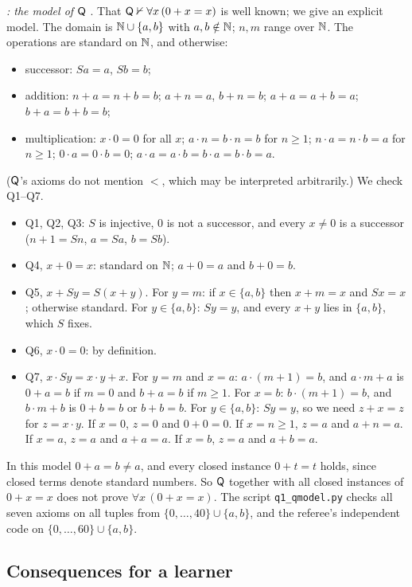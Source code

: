 \emph{: the model of $\mathsf{Q}$} . That $\mathsf{Q}\nvdash\forall x\,(0+x=x)$ is well known; we give an explicit model. The domain is $\mathbb{N}\cup\{a,b\}$ with $a,b\notin\mathbb{N}$; $n,m$ range over $\mathbb{N}$. The operations are standard on $\mathbb{N}$, and otherwise:
\begin{itemize}
\item successor: $Sa=a$, $Sb=b$;
\item addition: $n+a=n+b=b$; $a+n=a$, $b+n=b$; $a+a=a+b=a$; $b+a=b+b=b$;
\item multiplication: $x\cdot0=0$ for all $x$; $a\cdot n=b\cdot n=b$ for $n\ge1$; $n\cdot a=n\cdot b=a$ for $n\ge1$; $0\cdot a=0\cdot b=0$; $a\cdot a=a\cdot b=b\cdot a=b\cdot b=a$.
\end{itemize}
($\mathsf{Q}$'s axioms do not mention $<$, which may be interpreted arbitrarily.) We check Q1--Q7.
\begin{itemize}
\item Q1, Q2, Q3: $S$ is injective, $0$ is not a successor, and every $x\neq0$ is a successor ($n+1=S n$, $a=Sa$, $b=Sb$).
\item Q4, $x+0=x$: standard on $\mathbb{N}$; $a+0=a$ and $b+0=b$.
\item Q5, $x+Sy=S(x+y)$. For $y=m$: if $x\in\{a,b\}$ then $x+m=x$ and $Sx=x$; otherwise standard. For $y\in\{a,b\}$: $Sy=y$, and every $x+y$ lies in $\{a,b\}$, which $S$ fixes.
\item Q6, $x\cdot0=0$: by definition.
\item Q7, $x\cdot Sy=x\cdot y+x$. For $y=m$ and $x=a$: $a\cdot(m+1)=b$, and $a\cdot m+a$ is $0+a=b$ if $m=0$ and $b+a=b$ if $m\ge1$. For $x=b$: $b\cdot(m+1)=b$, and $b\cdot m+b$ is $0+b=b$ or $b+b=b$. For $y\in\{a,b\}$: $Sy=y$, so we need $z+x=z$ for $z=x\cdot y$. If $x=0$, $z=0$ and $0+0=0$. If $x=n\ge1$, $z=a$ and $a+n=a$. If $x=a$, $z=a$ and $a+a=a$. If $x=b$, $z=a$ and $a+b=a$.
\end{itemize}
In this model $0+a=b\neq a$, and every closed instance $0+t=t$ holds, since closed terms denote standard numbers. So $\mathsf{Q}$ together with all closed instances of $0+x=x$ does not prove $\forall x\,(0+x=x)$. The script \texttt{q1\_qmodel.py} checks all seven axioms on all tuples from $\{0,\dots,40\}\cup\{a,b\}$, and the referee's independent code on $\{0,\dots,60\}\cup\{a,b\}$.

\subsection{Consequences for a learner}\label{app:univ:learner}

